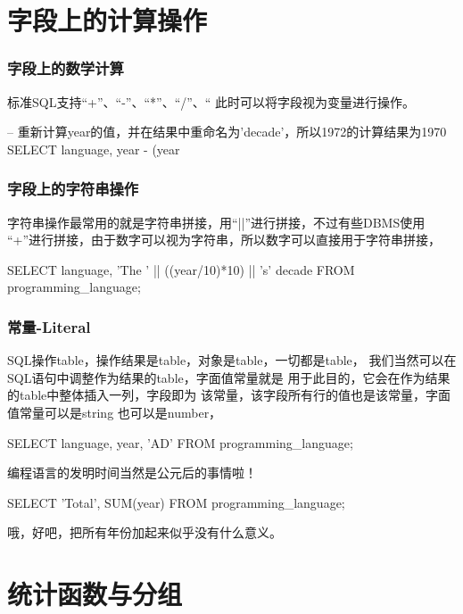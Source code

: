 \documentclass[a4paper,11pt]{article}
\begin{document}
\part[字段上的计算操作]{字段上的计算操作}
\section[字段上的数学计算]{字段上的数学计算}
标准SQL支持“+”、“-”、“*”、“/”、“%
此时可以将字段视为变量进行操作。

\begin{sqlcode}
-- 重新计算year的值，并在结果中重命名为'decade'，所以1972的计算结果为1970
SELECT language, year - (year %
\end{sqlcode}

\section[字段上的字符串操作]{字段上的字符串操作}
字符串操作最常用的就是字符串拼接，用“||”进行拼接，不过有些DBMS使用
“+”进行拼接，由于数字可以视为字符串，所以数字可以直接用于字符串拼接，

\begin{sqlcode}
SELECT language, 'The ' || ((year/10)*10) || 's' decade FROM programming_language;
\end{sqlcode}

\section[常量-Literal]{常量-Literal}
SQL操作table，操作结果是table，对象是table，一切都是table，
我们当然可以在SQL语句中调整作为结果的table，字面值常量就是
用于此目的，它会在作为结果的table中整体插入一列，字段即为
该常量，该字段所有行的值也是该常量，字面值常量可以是string
也可以是number，

\begin{sqlcode}
SELECT language, year, 'AD' FROM programming_language;
\end{sqlcode}

编程语言的发明时间当然是公元后的事情啦！

\begin{sqlcode}
SELECT 'Total', SUM(year) FROM programming_language;
\end{sqlcode}

哦，好吧，把所有年份加起来似乎没有什么意义。


\part[聚合与重组]{统计函数与分组}
\end{document}
